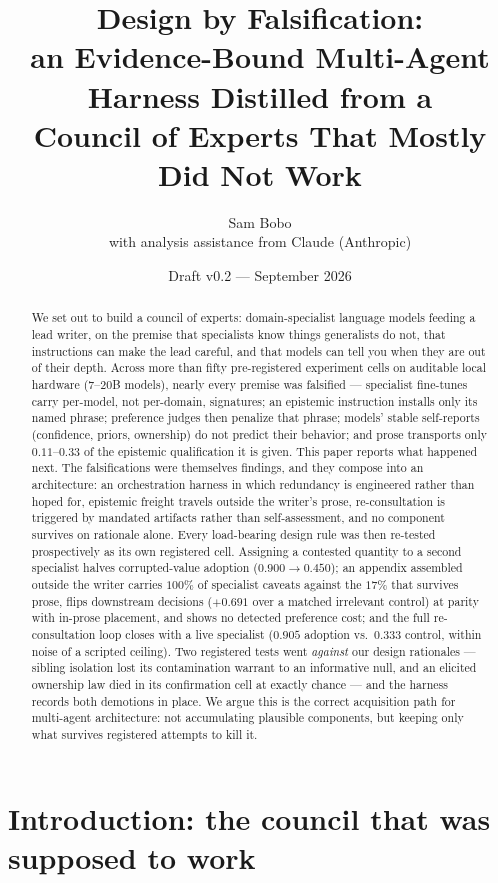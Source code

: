 \documentclass[11pt]{article}
\title{Design by Falsification:\\
an Evidence-Bound Multi-Agent Harness Distilled from a\\
Council of Experts That Mostly Did Not Work}
\author{Sam Bobo\\ \small with analysis assistance from Claude (Anthropic)}
\date{Draft v0.2 --- September 2026}
\begin{document}
\maketitle

\begin{abstract}
We set out to build a council of experts: domain-specialist language
models feeding a lead writer, on the premise that specialists know
things generalists do not, that instructions can make the lead careful,
and that models can tell you when they are out of their depth. Across
more than fifty pre-registered experiment cells on auditable local
hardware (7--20B models), nearly every premise was falsified ---
specialist fine-tunes carry per-model, not per-domain, signatures; an
epistemic instruction installs only its named phrase; preference judges
then penalize that phrase; models' stable self-reports (confidence,
priors, ownership) do not predict their behavior; and prose transports
only $0.11$--$0.33$ of the epistemic qualification it is given. This
paper reports what happened next. The falsifications were themselves
findings, and they compose into an architecture: an orchestration
harness in which redundancy is engineered rather than hoped for,
epistemic freight travels outside the writer's prose, re-consultation
is triggered by mandated artifacts rather than self-assessment, and no
component survives on rationale alone. Every load-bearing design rule
was then re-tested prospectively as its own registered cell. Assigning
a contested quantity to a second specialist halves corrupted-value
adoption ($0.900\to0.450$); an appendix assembled outside the writer
carries $100\%$ of specialist caveats against the $17\%$ that survives
prose, flips downstream decisions ($+0.691$ over a matched irrelevant
control) at parity with in-prose placement, and shows no detected
preference cost; and the full re-consultation loop closes with a live
specialist ($0.905$ adoption vs.\ $0.333$ control, within noise of a
scripted ceiling). Two registered tests went \emph{against} our design
rationales --- sibling isolation lost its contamination warrant to an
informative null, and an elicited ownership law died in its
confirmation cell at exactly chance --- and the harness records both
demotions in place. We argue this is the correct acquisition path for
multi-agent architecture: not accumulating plausible components, but
keeping only what survives registered attempts to kill it.
\end{abstract}

\section{Introduction: the council that was supposed to work}
\label{sec:intro}
\end{document}
